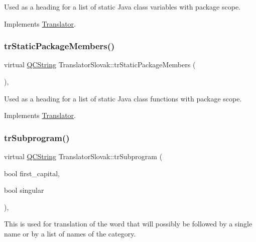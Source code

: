 Used as a heading for a list of static Java class variables with package scope. 

Implements \mbox{\hyperlink{class_translator}{Translator}}.

\mbox{\label{class_translator_slovak_a6e09843251685c05db33ff4af1218b0e}} 
\subsubsection{\texorpdfstring{trStaticPackageMembers()}{trStaticPackageMembers()}}
{\footnotesize\ttfamily virtual \mbox{\hyperlink{class_q_c_string}{Q\+C\+String}} Translator\+Slovak\+::tr\+Static\+Package\+Members (\begin{DoxyParamCaption}{ }\end{DoxyParamCaption})\hspace{0.3cm}{\ttfamily [inline]}, {\ttfamily [virtual]}}

Used as a heading for a list of static Java class functions with package scope. 

Implements \mbox{\hyperlink{class_translator}{Translator}}.

\mbox{\label{class_translator_slovak_a3f97d93199302c66d6cc1118ae63deaf}} 
\subsubsection{\texorpdfstring{trSubprogram()}{trSubprogram()}}
{\footnotesize\ttfamily virtual \mbox{\hyperlink{class_q_c_string}{Q\+C\+String}} Translator\+Slovak\+::tr\+Subprogram (\begin{DoxyParamCaption}\item[{bool}]{first\+\_\+capital,  }\item[{bool}]{singular }\end{DoxyParamCaption})\hspace{0.3cm}{\ttfamily [inline]}, {\ttfamily [virtual]}}

This is used for translation of the word that will possibly be followed by a single name or by a list of names of the category. 

